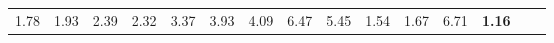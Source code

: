 \begin{tabular}{ll|rrrrrrrrr|rrrr}
  


  
  1.78 & 1.93 & 2.39 & 2.32 & 3.37 & 3.93 & 4.09 & 6.47 & 5.45 & 1.54 & 1.67 & 6.71 & \textbf{1.16} \\


\end{tabular}
